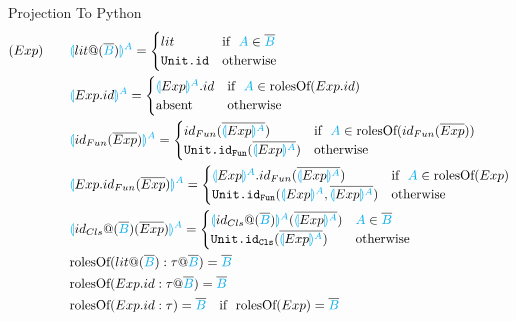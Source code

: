\documentclass[11pt]{jarticle}
\newcommand{\projection}[2]{{\color{cyan}\llparenthesis}#1{\color{cyan}\rrparenthesis^#2}}
\begin{document}
Projection To Python
\begin{alignat*}{2}
  &(Exp)~~~ &&\projection{lit@(\overline{\color{cyan}{B}})}{A}=
  \begin{cases}
    lit & \text{if}~~ {\color{cyan}A} \in \overline{\color{cyan}{B}}\\
    \texttt{Unit.id} &\text{otherwise}
  \end{cases}\\
  &&&\projection{Exp.id}{A}=
  \begin{cases}
    \projection{Exp}{A}.id &\text{if}~~{\color{cyan}A} \in \text{rolesOf} (Exp.id)\\
    \text{absent} &\text{otherwise}
  \end{cases}\\
  &&&\projection{id_{Fun}(\overline{Exp})}{A} =
  \begin{cases}
    id_{Fun}(\overline{\projection{Exp}{A}}) &\text{if}~~ {\color{cyan}A} \in \text{rolesOf} (id_{Fun}(\overline{Exp}))\\
    \texttt{Unit.id}_\texttt{Fun}(\overline{\projection{Exp}{A}}) &\text{otherwise}
  \end{cases}\\
  &&&\projection{Exp.id_{Fun}(\overline{Exp})}{A}=
  \begin{cases}
    \projection{Exp}{A}.id_{Fun}(\overline{\projection{Exp}{A}}) &\text{if}~~ {\color{cyan}A} \in \text{rolesOf}(Exp)\\
    \texttt{Unit.id}_\texttt{Fun}(\projection{Exp}{A},\overline{\projection{Exp}{A}}) &\color{black} \text{otherwise}
  \end{cases}\\
  &&&\projection{id_{Cls}@(\overline{\color{cyan}B})(\overline{Exp})}{A}=
  \begin{cases}
    \projection{id_{Cls}@(\overline{\color{cyan}B})}{A} (\overline{\projection{Exp}{A}}) & {\color{cyan}A} \in \overline{\color{cyan}B}\\
    \texttt{Unit.id}_\texttt{Cls}(\overline{\projection{Exp}{A}}) &\text{otherwise}
  \end{cases}\\
  &&&\text{rolesOf}(lit@(\overline{\color{cyan}B}):\tau@\overline{\color{cyan}B}) = {\overline{\color{cyan}B}}\\
  &&&\text{rolesOf}(Exp.id:\tau@\overline{\color{cyan}B}) = \overline{\color{cyan}B}\\
  &&&\text{rolesOf}(Exp.id:\tau) = \overline{\color{cyan}B} ~~~\text{if}~~ \text{rolesOf}(Exp)=\overline{\color{cyan}B}\\

\end{alignat*}
\end{document}
